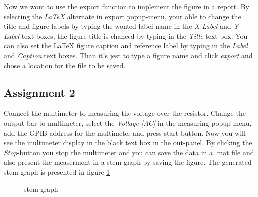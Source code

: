 Now we wont to use the export function to implement the figure in a report. By selecting the \emph{LaTeX} alternate in export popup-menu, your able to change the title and  figure labels  by typing the wonted label name in the \emph{X-Label} and \emph{Y-Label} text boxes, the figure title is chanced by typing in the \emph{Title} text box. You can also set the LaTeX figure caption and reference label by typing in the \emph{Label} and \emph{Caption} text boxes. Than it's jest to type a figure name and click \emph{export} and chose a location for the file to be saved.

\subsection{Assignment 2}
Connect the multimeter to measuring the voltage over the resistor. Change the output bar to multimeter, select the \emph{Voltage [AC]} in the measuring popup-menu, add the GPIB-address for the multimeter and press start button. Now you will see the multimeter display in the black text box in the out-panel. By clicking the \emph{Stop}-button you stop the multimeter and you can save the data in a .mat file and also present the measerment in a stem-graph by saving the figure. The generated stem-graph is presented in figure \ref{stem} 
	\begin{figure}[h]
	\centering
		\caption{stem graph}
		\label{stem}
	\end{figure}

